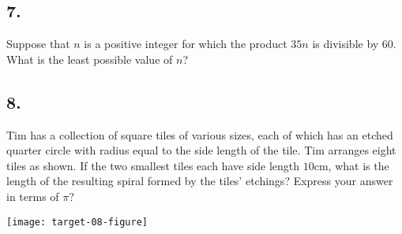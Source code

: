 \documentclass[12pt]{article}
\begin{document}
\subsection*{7.}
Suppose that $n$ is a positive integer for which the product $35n$ is divisible by $60$. What is the least possible value of $n$?

\nopagebreak

\fbox{\phantom{ANSWER}}

\begin{answer}
%
\end{answer}

\newpage

\subsection*{8.}
Tim has a collection of square tiles of various sizes, each of which has an etched quarter circle with radius equal to the side length of the tile. Tim arranges eight tiles as shown. If the two smallest tiles each have side length $10$cm, what is the length of the resulting spiral formed by the tiles' etchings? Express your answer in terms of $\pi$?

\begin{minipage}[b]{\linewidth}
\centering
\texttt{[image: target-08-figure]}
\end{minipage}

\nopagebreak
\end{document}
